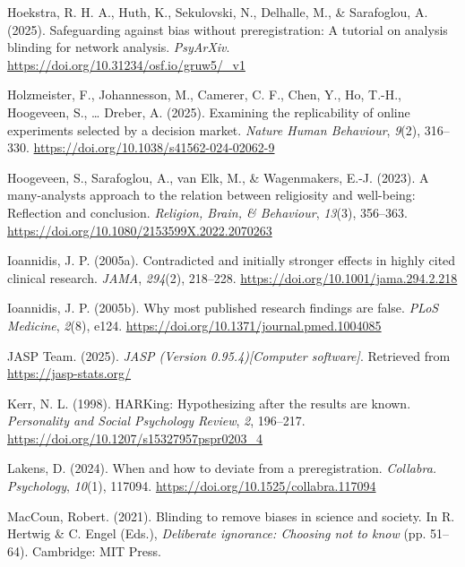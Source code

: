 \documentclass[
  english,
  man,floatsintext]{apa6}
\newlength{\cslhangindent}
\newenvironment{CSLReferences}[2] %
 {\begin{list}{}{%
  \setlength{\itemindent}{0pt}
  \setlength{\leftmargin}{0pt}
  \setlength{\parsep}{0pt}
  \ifodd #1
   \setlength{\leftmargin}{\cslhangindent}
   \setlength{\itemindent}{-1\cslhangindent}
  \fi
  \setlength{\itemsep}{#2\baselineskip}}}
 {\end{list}}
\begin{document}
\begin{CSLReferences}{1}{0}
Hoekstra, R. H. A., Huth, K., Sekulovski, N., Delhalle, M., \& Sarafoglou, A. (2025). Safeguarding against bias without preregistration: A tutorial on analysis blinding for network analysis. \emph{PsyArXiv}. \url{https://doi.org/10.31234/osf.io/gruw5/_v1}

Holzmeister, F., Johannesson, M., Camerer, C. F., Chen, Y., Ho, T.-H., Hoogeveen, S., \ldots{} Dreber, A. (2025). Examining the replicability of online experiments selected by a decision market. \emph{Nature Human Behaviour}, \emph{9}(2), 316--330. \url{https://doi.org/10.1038/s41562-024-02062-9}

{Hoogeveen, S., Sarafoglou, A., van Elk, M., \& Wagenmakers, E.-J.} (2023). A many-analysts approach to the relation between religiosity and well-being: {Reflection} and conclusion. \emph{Religion, Brain, \& Behaviour}, \emph{13}(3), 356--363. \url{https://doi.org/10.1080/2153599X.2022.2070263}

Ioannidis, J. P. (2005a). Contradicted and initially stronger effects in highly cited clinical research. \emph{JAMA}, \emph{294}(2), 218--228. \url{https://doi.org/10.1001/jama.294.2.218}

Ioannidis, J. P. (2005b). Why most published research findings are false. \emph{PLoS Medicine}, \emph{2}(8), e124. \url{https://doi.org/10.1371/journal.pmed.1004085}

JASP Team. (2025). \emph{{JASP (Version 0.95.4){[}Computer software{]}}}. Retrieved from \url{https://jasp-stats.org/}

Kerr, N. L. (1998). {HARK}ing: {H}ypothesizing after the results are known. \emph{Personality and Social Psychology Review}, \emph{2}, 196--217. \url{https://doi.org/10.1207/s15327957pspr0203_4}

Lakens, D. (2024). When and how to deviate from a preregistration. \emph{Collabra. Psychology}, \emph{10}(1), 117094. \url{https://doi.org/10.1525/collabra.117094}

MacCoun, Robert. (2021). Blinding to remove biases in science and society. In R. Hertwig \& C. Engel (Eds.), \emph{Deliberate ignorance: {C}hoosing not to know} (pp. 51--64). Cambridge: MIT Press.


\end{CSLReferences}
\end{document}
